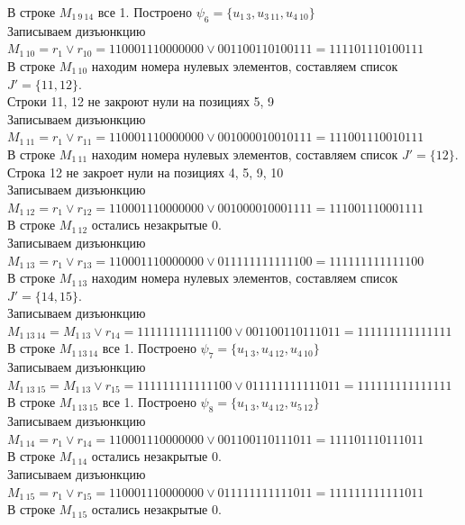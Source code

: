 \documentclass[a4paper,12pt]{article}
\begin{document}
В строке $M_{1\ 9\ 14}$ все 1. Построено $\psi_{6} = \{u_{1\ 3},u_{3\ 11},u_{4\ 10}\}$\\
Записываем дизъюнкцию $M_{1\ 10} = r_{1}\lor r_{10} = 110001110000000 \lor 001100110100111 = 111101110100111$\\
В строке $M_{1\ 10}$ находим номера нулевых элементов, составляем список $J' = \{11, 12\}$.\\
Строки 11, 12 не закроют нули на позициях 5, 9\\
Записываем дизъюнкцию $M_{1\ 11} = r_{1}\lor r_{11} = 110001110000000 \lor 001000010010111 = 111001110010111$\\
В строке $M_{1\ 11}$ находим номера нулевых элементов, составляем список $J' = \{12\}$.\\
Строка 12 не закроет нули на позициях 4, 5, 9, 10\\
Записываем дизъюнкцию $M_{1\ 12} = r_{1}\lor r_{12} = 110001110000000 \lor 001000010001111 = 111001110001111$\\
В строке $M_{1\ 12}$ остались незакрытые 0.\\
Записываем дизъюнкцию $M_{1\ 13} = r_{1}\lor r_{13} = 110001110000000 \lor 011111111111100 = 111111111111100$\\
В строке $M_{1\ 13}$ находим номера нулевых элементов, составляем список $J' = \{14, 15\}$.\\
Записываем дизъюнкцию $M_{1\ 13\ 14} = M_{1\ 13}\lor r_{14} = 111111111111100 \lor 001100110111011 = 111111111111111$\\
В строке $M_{1\ 13\ 14}$ все 1. Построено $\psi_{7} = \{u_{1\ 3},u_{4\ 12},u_{4\ 10}\}$\\
Записываем дизъюнкцию $M_{1\ 13\ 15} = M_{1\ 13}\lor r_{15} = 111111111111100 \lor 011111111111011 = 111111111111111$\\
В строке $M_{1\ 13\ 15}$ все 1. Построено $\psi_{8} = \{u_{1\ 3},u_{4\ 12},u_{5\ 12}\}$\\
Записываем дизъюнкцию $M_{1\ 14} = r_{1}\lor r_{14} = 110001110000000 \lor 001100110111011 = 111101110111011$\\
В строке $M_{1\ 14}$ остались незакрытые 0.\\
Записываем дизъюнкцию $M_{1\ 15} = r_{1}\lor r_{15} = 110001110000000 \lor 011111111111011 = 111111111111011$\\
В строке $M_{1\ 15}$ остались незакрытые 0.\\
\end{document}
